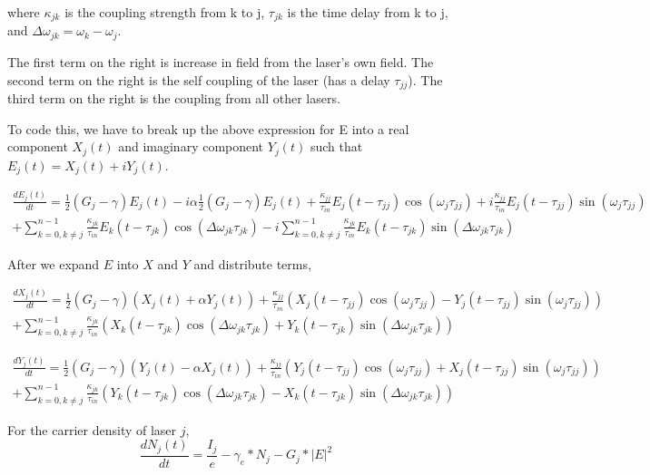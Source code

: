 \documentclass[11pt,letterpaper]{article}
\begin{document}
where  $\kappa_{jk}$ is the coupling strength from k to j,  $\tau_{jk}$ is the time delay from k to j,  and $\Delta\omega_{jk} = \omega_k - \omega_j$.

The first term on the right is increase in field from the laser's own field.
The second term on the right is the self coupling of the laser (has a delay $\tau_{jj}$).
The third term on the right is the coupling from all other lasers.

To code this, we have to break up the above expression for E into a real component $X_j(t)$ and imaginary component $Y_j(t)$ such that $E_j(t) = X_j(t) + i Y_j(t)$.

\begin{multline}
\frac{dE_j(t)}{dt} = \frac{1}{2}  (G_j - \gamma) E_j(t) - i \alpha \frac{1}{2}  (G_j - \gamma) E_j(t) + \frac{\kappa_{jj}}{\tau_{in}} E_j(t - \tau_{jj}) \cos(\omega_j \tau_{jj}) + i \frac{\kappa_{jj}}{\tau_{in}} E_j(t - \tau_{jj}) \sin(\omega_j \tau_{jj}) \\
+ \sum^{n - 1}_{k=0, k\neq j} \frac{\kappa_{jk}}{\tau_{in}} E_k(t - \tau_{jk}) \cos(\Delta\omega_{jk} \tau_{jk}) - i \sum^{n - 1}_{k=0, k\neq j} \frac{\kappa_{jk}}{\tau_{in}} E_k(t - \tau_{jk}) \sin(\Delta\omega_{jk} \tau_{jk})
\end{multline}

After we expand $E$ into $X$ and $Y$ and distribute terms,

\begin{multline}
\frac{dX_j(t)}{dt} = \frac{1}{2}  (G_j - \gamma) (X_j(t) + \alpha Y_j(t)) + \frac{\kappa_{jj}}{\tau_{in}} (X_j(t - \tau_{jj}) \cos(\omega_j \tau_{jj}) - Y_j(t - \tau_{jj}) \sin(\omega_j \tau_{jj})) \\
+ \sum^{n - 1}_{k=0, k\neq j} \frac{\kappa_{jk}}{\tau_{in}} ( X_k(t - \tau_{jk}) \cos(\Delta\omega_{jk} \tau_{jk}) + Y_k(t - \tau_{jk}) \sin(\Delta\omega_{jk} \tau_{jk}))
\end{multline}

\begin{multline}
\frac{dY_j(t)}{dt} = \frac{1}{2}  (G_j - \gamma) (Y_j(t) - \alpha X_j(t)) + \frac{\kappa_{jj}}{\tau_{in}} (Y_j(t - \tau_{jj}) \cos(\omega_j \tau_{jj}) + X_j(t - \tau_{jj}) \sin(\omega_j \tau_{jj})) \\
+ \sum^{n - 1}_{k=0, k\neq j} \frac{\kappa_{jk}}{\tau_{in}} ( Y_k(t - \tau_{jk}) \cos(\Delta\omega_{jk} \tau_{jk}) - X_k(t - \tau_{jk}) \sin(\Delta\omega_{jk} \tau_{jk}))
\end{multline}

For the carrier density of laser $j$,
\begin{equation}
\frac{dN_j(t)}{dt} = \frac{I_j}{e} - \gamma_e * N_j - G_j * |E|^2
\end{equation}
\end{document}
